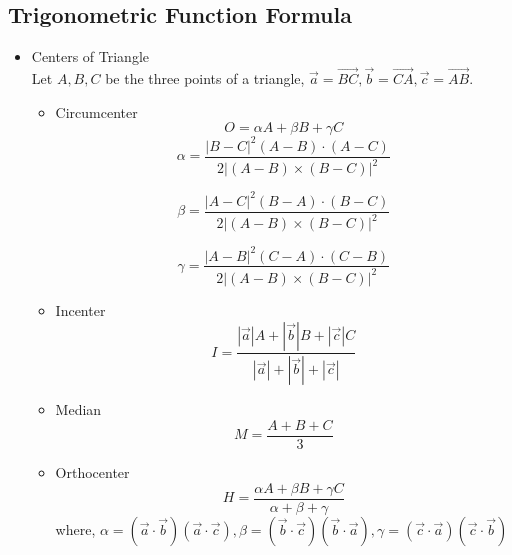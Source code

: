 \documentclass{article}
\begin{document}
    \subsection{Trigonometric Function Formula}
        \begin{itemize}
            \item Centers of Triangle \\
            Let $A, B, C$ be the three points of a triangle, $\vec{a} = \vec{BC}, \vec{b} = \vec{CA}, \vec{c} = \vec{AB}$. 
                \begin{itemize}
                \item Circumcenter
                  \begin{equation*}
                O = \alpha A + \beta B + \gamma C
                  \end{equation*}
                  \begin{equation*}
                  \alpha = \frac{ |B-C|^2 (A-B) \cdot (A-C) }{ 2 | (A-B) \times (B-C) |^2}
                  \end{equation*}

                  \begin{equation*}
                  \beta = \frac{ |A-C|^2 (B-A) \cdot (B-C) }{ 2 |(A-B) \times (B-C) |^2}
                  \end{equation*}

                  \begin{equation*}
                  \gamma = \frac{ |A-B|^2 (C-A) \cdot (C-B)}{ 2 |(A-B) \times (B-C)|^2}
                  \end{equation*}
                \item Incenter 
                  \begin{equation*}
                I = \frac{|\vec{a}| A + | \vec{b} | B + | \vec{c} | C}{| \vec{a} |  + | \vec{b} | + | \vec{c} | }
                  \end{equation*}
                \item Median
                  \begin{equation*}
                M = \frac{A+B+C}{3}
                  \end{equation*}
                \item Orthocenter
                  \begin{equation*}
                H = \frac{ \alpha A + \beta B + \gamma C }{ \alpha + \beta + \gamma }
                  \end{equation*}
                  where,  $\alpha = (\vec{a} \cdot \vec{b})(\vec{a} \cdot \vec{c}), \beta = (\vec{b} \cdot \vec{c})(\vec{b} \cdot \vec{a}), \gamma = (\vec{c} \cdot \vec{a})(\vec{c} \cdot \vec{b})$
                \end{itemize}
        \end{itemize}
\end{document}
